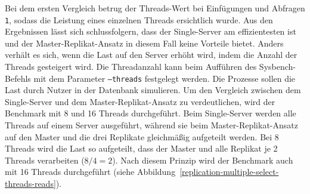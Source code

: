 Bei dem ersten Vergleich betrug der Threads-Wert bei Einfügungen und Abfragen \texttt{1}, sodass die Leistung eines einzelnen Threads ersichtlich wurde.
Aus den Ergebnissen lässt sich schlussfolgern, dass der Single-Server am effizientesten ist und der Master-Replikat-Ansatz in diesem Fall keine Vorteile bietet.
Anders verhält es sich, wenn die Last auf den Server erhöht wird, indem die Anzahl der Threads gesteigert wird.
Die Threadanzahl kann beim Aufführen des Sysbench-Befehls mit dem Parameter \texttt{--threads} festgelegt werden.
Die Prozesse sollen die Last durch Nutzer in der Datenbank simulieren.
Um den Vergleich zwischen dem Single-Server und dem Master-Replikat-Ansatz zu verdeutlichen, wird der Benchmark mit 8 und 16 Threads durchgeführt.
Beim Single-Server werden alle Threads auf einem Server ausgeführt, während sie beim Master-Replikat-Ansatz auf den Master und die drei Replikate gleichmäßig aufgeteilt werden.
Bei 8 Threads wird die Last so aufgeteilt, dass der Master und alle Replikat je 2 Threads verarbeiten ($8 / 4 = 2$).
Nach diesem Prinzip wird der Benchmark auch mit 16 Threads durchgeführt (siehe Abbildung~\ref{replication-multiple-select-threads-reads}).


